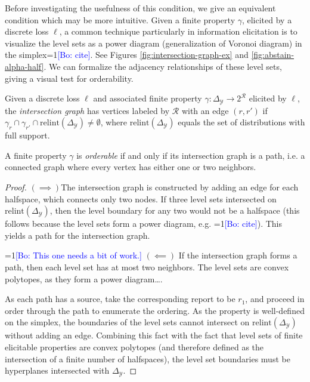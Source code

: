 \documentclass[anon]{colt2020} %
\newcommand{\Comments}{1}
\newcommand{\mynote}[2]{\ifnum\Comments=1\textcolor{#1}{#2}\fi}
\newcommand{\bo}[1]{\mynote{blue}{[Bo: #1]}}
\newcommand{\relint}{\mathrm{relint}}
\newcommand{\simplex}{\Delta_\Y}
\newcommand{\R}{\mathcal{R}}
\newcommand{\Y}{\mathcal{Y}}
\begin{document}
Before investigating the usefulness of this condition, we give an equivalent condition which may be more intuitive.
Given a finite property $\gamma$, elicited by a discrete loss $\ell$, a common technique particularly in information elicitation is to visualize the level sets as a power diagram (generalization of Voronoi diagram) in the simplex\bo{cite}.
See Figures \ref{fig:intersection-graph-ex} and \ref{fig:abstain-alpha-half}.
We can formalize the adjacency relationships of these level sets, giving a visual test for orderability.

\begin{definition}\label{def:intersection-graph}
  Given a discrete loss $\ell$ and associated finite property $\gamma: \simplex \to 2^{\R}$ elicited by $\ell$, the \emph{intersection graph} has vertices labeled by $\R$ with an edge $(r,r')$ if $\gamma_r \cap \gamma_{r'} \cap \relint(\simplex) \neq \emptyset$, where $\relint(\simplex)$ equals the set of distributions with full support.
\end{definition}
\begin{proposition} \label{prop:orderable-iff-path}
  A finite property $\gamma$ is \emph{orderable} if and only if its intersection graph is a path, i.e. a connected graph where every vertex has either one or two neighbors.
\end{proposition}
\begin{proof}
  $(\implies)$The intersection graph is constructed by adding an edge for each halfspace, which connects only two nodes.
  If three level sets intersected on $\relint(\simplex)$, then the level boundary for any two would not be a halfspace (this follows because the level sets form a power diagram, e.g. \bo{cite}).
  This yields a path for the intersection graph.
  
  \bigskip
  \bo{This one needs a bit of work.}
  $(\impliedby)$ If the intersection graph forms a path, then each level set has at most two neighbors.
  The level sets are convex polytopes, as they form a power diagram\dots.
  
  As each path has a source, take the corresponding report to be $r_1$, and proceed in order through the path to enumerate the ordering.
  As the property is well-defined on the simplex, the boundaries of the level sets cannot intersect on $\relint(\simplex)$ without adding an edge.
  Combining this fact with the fact that level sets of finite elicitable properties are convex polytopes (and therefore defined as the intersection of a finite number of halfspaces), the level set boundaries must be hyperplanes intersected with $\simplex$. 
\end{proof}
\end{document}
